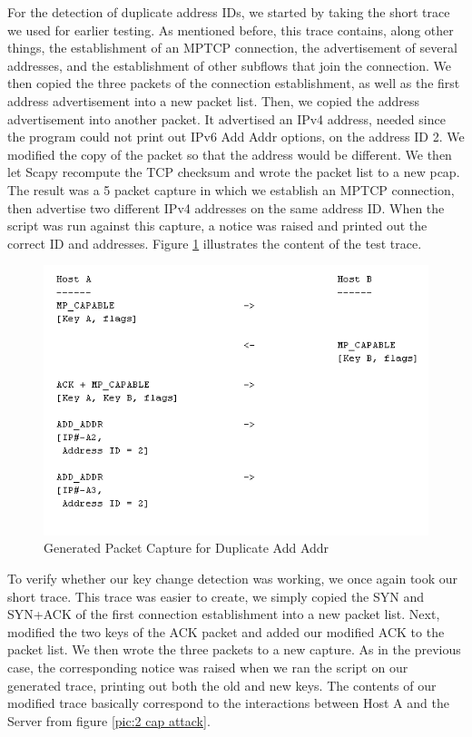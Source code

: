 For the detection of duplicate address IDs, we started by taking the short trace we used for earlier testing. As mentioned before, this trace contains, along other things, the establishment of an MPTCP connection, the advertisement of several addresses, and the establishment of other subflows that join the connection. We then copied the three packets of the connection establishment, as well as the first address advertisement into a new packet list. Then, we copied the address advertisement into another packet. It advertised an IPv4 address, needed since the program could not print out IPv6 Add Addr options, on the address ID 2. We modified the copy of the packet so that the address would be different. We then let Scapy recompute the TCP checksum and wrote the packet list to a new pcap. The result was a 5 packet capture in which we establish an MPTCP connection, then advertise two different IPv4 addresses on the same address ID. When the script was run against this capture, a notice was raised and printed out the correct ID and addresses. Figure \ref{pic:bad add} illustrates the content of the test trace.\\

\begin{figure}[!t]
\centering
\includegraphics[scale = 0.75]{Figures/addpcap.png}
\caption{Generated Packet Capture for Duplicate Add Addr}
\label{pic:bad add}
\end{figure}

To verify whether our key change detection was working, we once again took our short trace. This trace was easier to create, we simply copied the SYN and SYN+ACK of the first connection establishment into a new packet list. Next, modified the two keys of the ACK packet and added our modified ACK to the packet list. We then wrote the three packets to a new capture. As in the previous case, the corresponding notice was raised when we ran the script on our generated trace, printing out both the old and new keys. The contents of our modified trace basically correspond to the interactions between Host A and the Server from figure \ref{pic:2 cap attack}. \\


